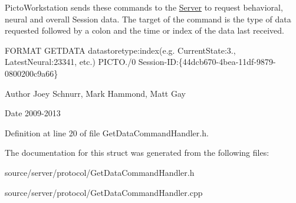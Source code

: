 Picto\-Workstation sends these commands to the \hyperlink{class_server}{Server} to request behavioral, neural and overall Session data. The target of the command is the type of data requested followed by a colon and the time or index of the data last received.

F\-O\-R\-M\-A\-T G\-E\-T\-D\-A\-T\-A datastoretype\-:index(e.\-g. Current\-State\-:3., Latest\-Neural\-:23341, etc.) P\-I\-C\-T\-O./0 Session-\/\-I\-D\-:\{44dcb670-\/4bea-\/11df-\/9879-\/0800200c9a66\} \begin{DoxyAuthor}{Author}
Joey Schnurr, Mark Hammond, Matt Gay 
\end{DoxyAuthor}
\begin{DoxyDate}{Date}
2009-\/2013 
\end{DoxyDate}


Definition at line 20 of file Get\-Data\-Command\-Handler.\-h.



The documentation for this struct was generated from the following files\-:\begin{DoxyCompactItemize}
\item 
source/server/protocol/Get\-Data\-Command\-Handler.\-h\item 
source/server/protocol/Get\-Data\-Command\-Handler.\-cpp\end{DoxyCompactItemize}
